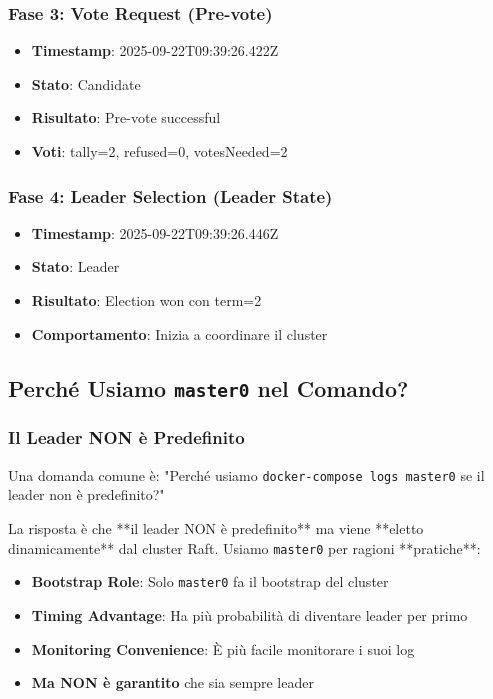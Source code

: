 \documentclass[12pt,a4paper]{article}
\begin{document}
\subsubsection{Fase 3: Vote Request (Pre-vote)}

\begin{itemize}
\item \textbf{Timestamp}: 2025-09-22T09:39:26.422Z
\item \textbf{Stato}: Candidate
\item \textbf{Risultato}: Pre-vote successful
\item \textbf{Voti}: tally=2, refused=0, votesNeeded=2
\end{itemize}

\subsubsection{Fase 4: Leader Selection (Leader State)}

\begin{itemize}
\item \textbf{Timestamp}: 2025-09-22T09:39:26.446Z
\item \textbf{Stato}: Leader
\item \textbf{Risultato}: Election won con term=2
\item \textbf{Comportamento}: Inizia a coordinare il cluster
\end{itemize}

\subsection{Perché Usiamo \texttt{master0} nel Comando?}

\subsubsection{Il Leader NON è Predefinito}

Una domanda comune è: "Perché usiamo \texttt{docker-compose logs master0} se il leader non è predefinito?"

La risposta è che **il leader NON è predefinito** ma viene **eletto dinamicamente** dal cluster Raft. Usiamo \texttt{master0} per ragioni **pratiche**:

\begin{itemize}
\item \textbf{Bootstrap Role}: Solo \texttt{master0} fa il bootstrap del cluster
\item \textbf{Timing Advantage}: Ha più probabilità di diventare leader per primo
\item \textbf{Monitoring Convenience}: È più facile monitorare i suoi log
\item \textbf{Ma NON è garantito} che sia sempre leader
\end{itemize}
\end{document}
